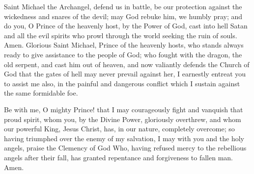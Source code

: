 \label{prayer:StMichael}
Saint Michael the Archangel, defend us in battle, be our protection against the wickedness and snares of the devil;
may God rebuke him, we humbly pray;
and do you, O Prince of the heavenly host, by the Power of God, cast into hell Satan and all the evil spirits who prowl through the world seeking the ruin of souls.
Amen.
\newpage
{}
\label{prayer:help_against_spiritual_enemies}
Glorious Saint Michael, Prince of the heavenly hosts, who stands always ready to give assistance to the people of God;
who fought with the dragon, the old serpent, and cast him out of heaven, and now valiantly defends the Church of God that the gates of hell may never prevail against her, I earnestly entreat you to assist me also, in the painful and dangerous conflict which I sustain against the same formidable foe.

Be with me, O mighty Prince!
that I may courageously fight and vanquish that proud spirit, whom you, by the Divine Power, gloriously overthrew, and whom our powerful King, Jesus Christ, has, in our nature, completely overcome;
so having triumphed over the enemy of my salvation, I may with you and the holy angels, praise the Clemency of God Who, having refused mercy to the rebellious angels after their fall, has granted repentance and forgiveness to fallen man. Amen.

\newpage